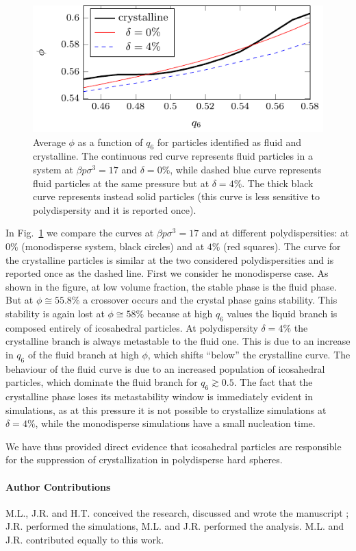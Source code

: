 \documentclass[twocolumn,superscriptaddress]{revtex4-1}
\begin{document}
\begin{figure}
 \centering
 \includegraphics{fig_stability_map}
 \caption{Average $\phi$ as a function of $q_6$ for particles identified as fluid and crystalline. The continuous red curve represents fluid particles in a system at $\beta p\sigma^3=17$ and $\delta=0\%$, while dashed blue curve represents fluid particles at the same pressure but at $\delta=4\%$. The thick black curve represents instead solid particles (this curve is less sensitive to polydispersity and it is reported once).}
 \label{fig:stability_map}
\end{figure}

In Fig.~\ref{fig:stability_map}
we compare the curves at $\beta p\sigma^3=17$ and at different polydispersities:
at $0\%$ (monodisperse system, black circles) and at $4\%$ (red squares). The curve for the
crystalline particles is similar at the two considered polydispersities and is reported once
as the dashed line. First we consider he monodisperse case. As shown in the figure,
at low volume fraction, the stable phase is the fluid phase. But at $\phi\cong 55.8\%$ a crossover
occurs and the crystal phase gains stability. This stability is again lost at $\phi\cong 58\%$
because at high $q_6$ values the liquid branch is composed entirely of icosahedral particles.
At polydispersity $\delta=4\%$ the crystalline branch is always metastable to the fluid one.
This is due to an increase in $q_6$ of the fluid branch at high $\phi$, which shifts ``below'' the
crystalline curve. The behaviour of the fluid curve is due to an increased population of
icosahedral particles, which dominate the fluid branch for $q_6\gtrsim 0.5$. The fact that
the crystalline phase loses its metastability window is immediately evident in simulations,
as at this pressure it is not possible to crystallize simulations at $\delta=4\%$, while the
monodisperse simulations have a small nucleation time.

We have thus provided direct evidence that icosahedral particles are responsible for the suppression
of crystallization in polydisperse hard spheres.

\paragraph*{\bf Author Contributions}
M.L., J.R. and H.T. conceived the research, discussed and wrote the manuscript ; J.R. performed the simulations, M.L. and J.R. performed the analysis. M.L. and J.R. contributed equally to this work.




\end{document}
